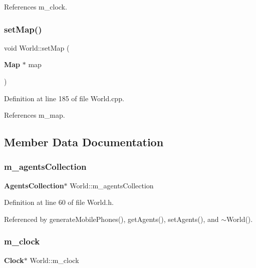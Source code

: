 References m\+\_\+clock.

\mbox{\label{class_world_a9dc80487d5c2d1d4f2af0c1d7f015204}} 
\subsubsection{setMap()}
{\footnotesize\ttfamily void World\+::set\+Map (\begin{DoxyParamCaption}\item[{\textbf{ Map} $\ast$}]{map }\end{DoxyParamCaption})}



Definition at line 185 of file World.\+cpp.



References m\+\_\+map.



\subsection{Member Data Documentation}
\mbox{\label{class_world_ae1262689381f00828c0a639b7cbb52a3}} 
\subsubsection{m\_agentsCollection}
{\footnotesize\ttfamily \textbf{ Agents\+Collection}$\ast$ World\+::m\+\_\+agents\+Collection\hspace{0.3cm}{\ttfamily [private]}}



Definition at line 60 of file World.\+h.



Referenced by generate\+Mobile\+Phones(), get\+Agents(), set\+Agents(), and $\sim$\+World().

\mbox{\label{class_world_a8359eb424f01e41703faa0885a4414bf}} 
\subsubsection{m\_clock}
{\footnotesize\ttfamily \textbf{ Clock}$\ast$ World\+::m\+\_\+clock\hspace{0.3cm}{\ttfamily [private]}}



